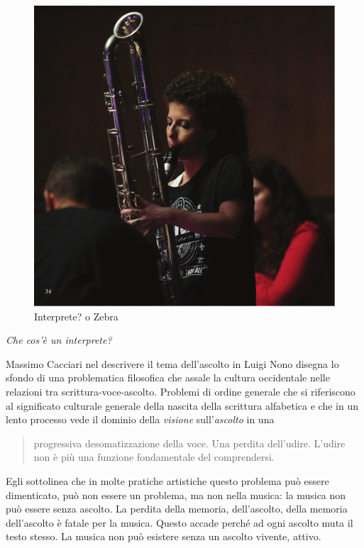 \documentclass{gs-adonis}
\begin{document}
\begin{figure}[t]
  \centering
  \includegraphics[width=\linewidth]{images/panthera.pdf}
  \captionsetup{width=.81\linewidth}
  \caption{Interprete? o Zebra}
  \label{alice}
\end{figure}

\emph{Che cos'è un interprete?}

Massimo Cacciari nel descrivere il tema dell'ascolto in Luigi Nono
\cite{Cacciari1995} disegna lo sfondo di una problematica filosofica che assale
la cultura occidentale nelle relazioni tra scrittura-voce-ascolto. Problemi di
ordine generale che si riferiscono al significato culturale generale della
nascita della scrittura alfabetica e che in un lento processo vede il dominio
della \emph{visione} sull'\emph{ascolto} in una

\begin{quote}
  progressiva desomatizzazione della voce. Una perdita dell'udire. L'udire
  non è più una funzione fondamentale del comprendersi. \cite{Cacciari1995}
\end{quote}

Egli sottolinea che in molte pratiche artistiche questo problema può essere
dimenticato, può non essere un problema, ma non nella musica: la musica non può
essere senza ascolto. La perdita della memoria, dell'ascolto, della memoria
dell'ascolto è fatale per la musica. Questo accade perché ad ogni ascolto muta
il testo stesso. La musica non può esistere senza un ascolto vivente, attivo.
\end{document}
